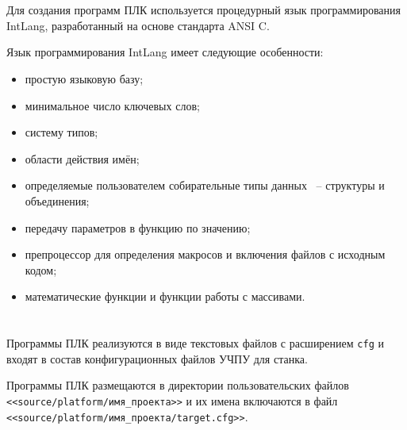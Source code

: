 \section{}

Для создания программ ПЛК используется процедурный язык программирования IntLang, разработанный на основе стандарта ANSI C.

Язык программирования IntLang имеет следующие особенности:
\begin{itemize}
\item простую языковую базу;
\item минимальное число ключевых слов;
\item систему типов;
\item области действия имён;
\item определяемые пользователем собирательные типы данных ~-- структуры и объединения;
\item передачу параметров в функцию по значению;
\item препроцессор для определения макросов и включения файлов с исходным кодом;
\item математические функции и функции работы с массивами. \killoverfullbefore 
\end{itemize}

\section{}

Программы ПЛК реализуются в виде текстовых файлов с расширением \texttt{cfg} и входят 
в состав конфигурационных файлов УЧПУ для станка. \killoverfullbefore 

Программы ПЛК размещаются в директории пользовательских файлов \texttt{<<source/platform/имя\_проекта>>} и их имена включаются в файл \texttt{<<source/platform/имя\_проекта/target.cfg>>}. \killoverfullbefore 



\clearpage